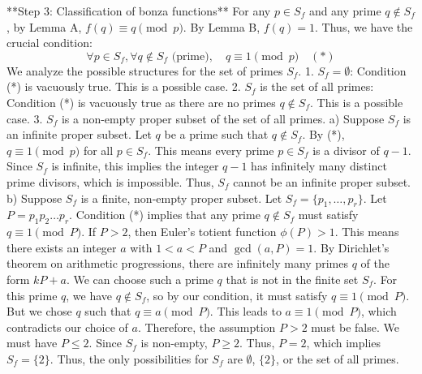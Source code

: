 \documentclass[12pt]{article}
\begin{document}
**Step 3: Classification of bonza functions**
For any $p \in S_f$ and any prime $q \notin S_f$, by Lemma A, $f(q) \equiv q \pmod p$. By Lemma B, $f(q)=1$. Thus, we have the crucial condition:
$$ \forall p \in S_f, \forall q \notin S_f \text{ (prime)}, \quad q \equiv 1 \pmod p \quad (*) $$
We analyze the possible structures for the set of primes $S_f$.
1.  $S_f = \emptyset$: Condition (*) is vacuously true. This is a possible case.
2.  $S_f$ is the set of all primes: Condition (*) is vacuously true as there are no primes $q \notin S_f$. This is a possible case.
3.  $S_f$ is a non-empty proper subset of the set of all primes.
    a) Suppose $S_f$ is an infinite proper subset. Let $q$ be a prime such that $q \notin S_f$. By (*), $q \equiv 1 \pmod p$ for all $p \in S_f$. This means every prime $p \in S_f$ is a divisor of $q-1$. Since $S_f$ is infinite, this implies the integer $q-1$ has infinitely many distinct prime divisors, which is impossible. Thus, $S_f$ cannot be an infinite proper subset.
    b) Suppose $S_f$ is a finite, non-empty proper subset. Let $S_f = \{p_1, \dots, p_r\}$. Let $P = p_1 p_2 \dots p_r$. Condition (*) implies that any prime $q \notin S_f$ must satisfy $q \equiv 1 \pmod P$.
    If $P > 2$, then Euler's totient function $\phi(P) > 1$. This means there exists an integer $a$ with $1 < a < P$ and $\gcd(a, P)=1$. By Dirichlet's theorem on arithmetic progressions, there are infinitely many primes $q$ of the form $kP+a$. We can choose such a prime $q$ that is not in the finite set $S_f$. For this prime $q$, we have $q \notin S_f$, so by our condition, it must satisfy $q \equiv 1 \pmod P$. But we chose $q$ such that $q \equiv a \pmod P$. This leads to $a \equiv 1 \pmod P$, which contradicts our choice of $a$.
    Therefore, the assumption $P>2$ must be false. We must have $P \le 2$.
    Since $S_f$ is non-empty, $P \ge 2$. Thus, $P=2$, which implies $S_f=\{2\}$.
Thus, the only possibilities for $S_f$ are $\emptyset$, $\{2\}$, or the set of all primes.
\end{document}
